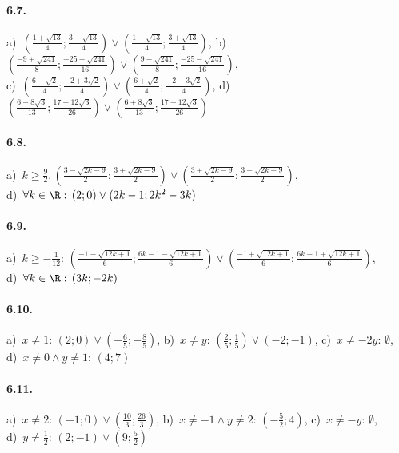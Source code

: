 \paragraph{6.7.} 
a)~\(\left(\frac{1+\sqrt{13}} 4;\frac{3-\sqrt{13}} 4\right)\vee 
\left(\frac{1-\sqrt{13}} 4;\frac{3+\sqrt{13}} 4\right)\),\; 
b)~\(\left(\frac{-9+\sqrt{241}} 8;\frac{-25+\sqrt{241}}{16}\right)\vee 
\left(\frac{9-\sqrt{241}} 8;\frac{-25-\sqrt{241}}{16}\right)\),\protect\\
c)~\(\left(\frac{6-\sqrt 2} 4;\frac{-2+3\sqrt 2} 4\right)\vee 
\left(\frac{6+\sqrt 2} 4;\frac{-2-3\sqrt 2} 4\right)\),\quad 
d)~\(\left(\frac{6-8\sqrt 3}{13};
\frac{17+12\sqrt 3}{26}\right)\vee\left(\frac{6+ 8\sqrt 3}{13};
\frac{17-12\sqrt 3}{26}\right)\)

\paragraph{6.8.} 
a)~\(k\ge \frac 9 2.\, \left(\frac{3-\sqrt{2k-9}} 2; 
\frac{3+\sqrt{2k-9}} 2\right)\vee \left(\frac{3+\sqrt{2k-9}} 2; 
\frac{3-\sqrt{2k-9}} 2\right)\),\protect\\
\quad 
d)~\(\forall k\in \R:\, (2; 0)\vee (2k-1; 2k^2-3k)\)

\paragraph{6.9.} 
a)~\(k\ge -\frac 1{12}:\, \left(\frac{-1-\sqrt{12k+1}} 6; 
\frac{6k-1-\sqrt{12k+1}} 6\right) \vee \left(\frac{-1+\sqrt{12k+1}} 6; 
\frac{6k-1+\sqrt{12k+1}} 6\right)\),\protect\\
\quad 
d)~\(\forall k\in \R:\, (3k; -2k)\)

\paragraph{6.10.} 
a)~\(x\neq 1:\, \left(2;0\right)\vee \left(-\frac 6 5;-\frac 8 5\right)\),
\quad 
b)~\(x\neq y:\, \left(\frac 2 5;\frac 1 5\right)\vee \left(-2;-1\right)\),
\quad 
c)~\(x\neq -2y:\, \emptyset \),\quad \protect\\
d)~\(x\neq 0\wedge y\neq 1:\, (4;7)\)

\paragraph{6.11.} 
a)~\(x\neq 2:\, \left(-1;0\right)\vee \left(\frac{10} 3;
\frac{26} 3\right)\),\quad 
b)~\(x\neq -1\wedge y\neq 2:\, \left(-\frac 5 2;4\right)\),\quad 
c)~\(x\neq -y:\, \emptyset \),\quad \protect\\
d)~\(y\neq \frac 1 2:\, \left(2;-1\right)\vee \left(9;\frac 5 2\right)\)

